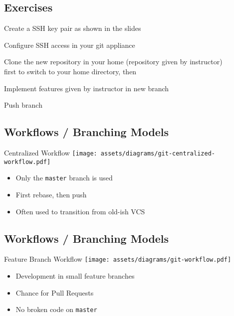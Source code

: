 \subsection{Exercises}
\begin{frame}[fragile]
  \subslidetitle
  \begin{exercise}
    \item Create a SSH key pair as shown in the slides
    \item Configure SSH access in your git appliance
    \item Clone the new repository in your home (repository given by instructor)\\
       first to switch to your home directory, then\\
    \item Implement features given by instructor in new branch
    \item Push branch
  \end{exercise}
\end{frame}

\subsection{Workflows / Branching Models}
\begin{frame}[fragile]
  \subslidetitle
  Centralized Workflow
  \center \texttt{[image: assets/diagrams/git-centralized-workflow.pdf]}

  \vspace{2em}
  \begin{itemize}
    \item Only the \lstinline{master} branch is used
    \item First rebase, then push
    \item Often used to transition from old-ish VCS
  \end{itemize}
\end{frame}

\subsection{Workflows / Branching Models}
\begin{frame}[fragile]
  \subslidetitle
  Feature Branch Workflow
  \center \texttt{[image: assets/diagrams/git-workflow.pdf]}

  \vspace{2em}
  \begin{itemize}
    \item Development in small feature branches
    \item Chance for Pull Requests
    \item No broken code on \lstinline{master}
  \end{itemize}
\end{frame}

